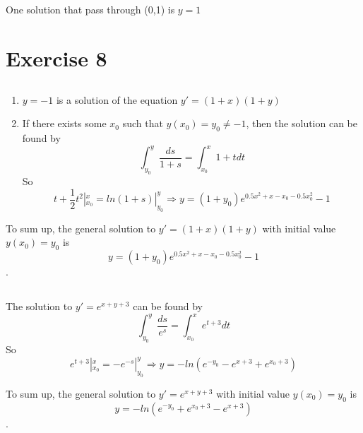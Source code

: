 \documentclass[a4paper,12pt,titlepage]{article}
\begin{document}
\subsection{}
One solution that pass through (0,1) is $y=1$

\section{Exercise 8}
\subsection{}
\begin{enumerate}
\item $y=-1$ is a solution of the equation $y'=(1+x)(1+y)$
\item If there exists some $x_0$ such that $y(x_0)=y_0\neq-1$, then the solution can be found by 
$$\int_{y_0}^y\dfrac{ds}{1+s}=\int_{x_0}^x1+tdt$$
So 
$$t+\dfrac{1}{2}t^2|^x_{x_0}=ln(1+s)|_{y_0}^y\Rightarrow y=(1+y_0)e^{0.5x^2+x-x_0-0.5x_0^2}-1$$
\end{enumerate}
To sum up, the general solution to $y'=(1+x)(1+y)$ with initial value $y(x_0)=y_0$ is $$y=(1+y_0)e^{0.5x^2+x-x_0-0.5x_0^2}-1$$.

\subsection{}
The solution to $y'=e^{x+y+3}$ can be found by 
$$\int_{y_0}^y\dfrac{ds}{e^s}=\int_{x_0}^xe^{t+3}dt$$
So 
$$e^{t+3}|^x_{x_0}=-e^{-s}|_{y_0}^y\Rightarrow y=-ln(e^{-y_0}-e^{x+3}+e^{x_0+3})$$

To sum up, the general solution to $y'=e^{x+y+3}$ with initial value $y(x_0)=y_0$ is $$y=-ln(e^{-y_0}+e^{x_0+3}-e^{x+3})$$.
\end{document}
